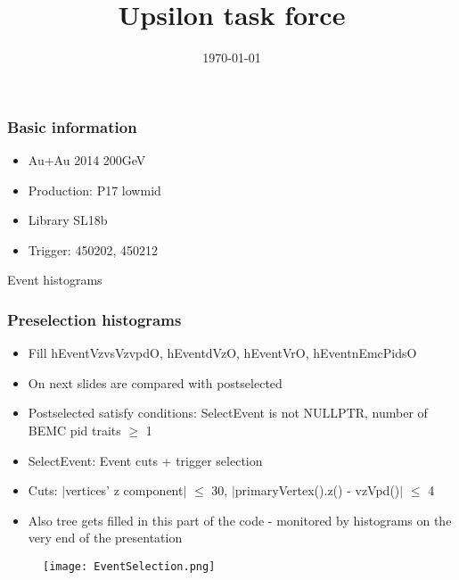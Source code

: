 \documentclass{beamer}
\title[Upsilon task force]{Upsilon task force}
\author{}
\date{\today}
\begin{document}

\begin{frame}
  \titlepage
\end{frame}





\begin{frame}
  \frametitle{Basic information}
  \begin{itemize}
  \item Au+Au 2014 200GeV
  \item Production: P17 lowmid
  \item Library SL18b
  \item Trigger: 450202, 450212
  \end{itemize}
\end{frame}


\begin{frame}[plain,c]
 	\begin{center}
 	\Huge Event histograms
 	\end{center}
\end{frame}

\begin{frame}
  \frametitle{Preselection histograms}
  \begin{itemize}
    \item Fill hEventVzvsVzvpdO, hEventdVzO, hEventVrO, hEventnEmcPidsO
    \item On next slides are compared with postselected
    \item Postselected satisfy conditions: SelectEvent is not NULLPTR, number of BEMC pid traits $\geq$ 1
    \item SelectEvent: Event cuts + trigger selection
    \item Cuts: $|$vertices' z component$|$ $\leq$ 30, $|$primaryVertex().z() - vzVpd()$|$ $\leq$ 4
    \item Also tree gets filled in this part of the code - monitored by histograms on the very end of the presentation
  \end{itemize}
\end{frame}

\begin{frame}
	\begin{figure}[h!]
		\centering
		\texttt{[image: EventSelection.png]}
	\end{figure}
\end{frame}
\end{document}
